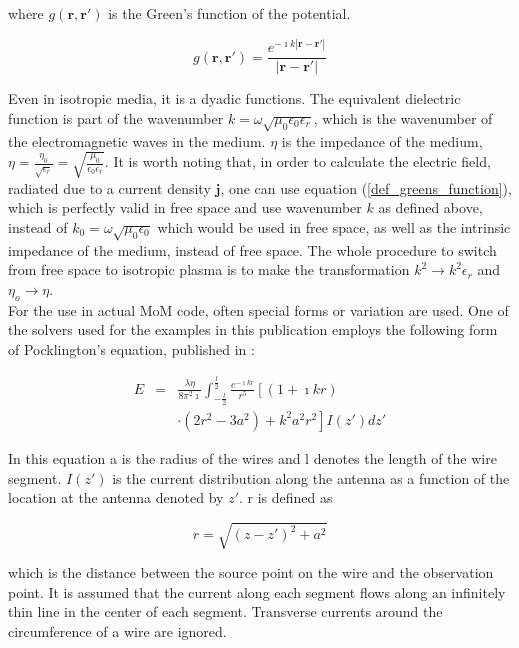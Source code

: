 \documentclass[two-column,ras]{agutex}
\begin{document}
\begin{article}
where $g(\mathbf{r},\mathbf{r'})$ is the Green's function of the potential.

\begin{equation}\label{eq:greens_func_vac}
    g(\mathbf{r},\mathbf{r'})= \frac{e^{- \imath k  | \mathbf{r}-\mathbf{r'} |}}{| \mathbf{r}-\mathbf{r'} |}
\end{equation}

Even in isotropic media, it is a dyadic functions. The equivalent dielectric function is part of the wavenumber $k=\omega \sqrt{\mu_0 \epsilon_0 \epsilon_r}$, which is the wavenumber of the electromagnetic waves in the medium. $\eta$ is the impedance of the medium, $\eta=\frac{\eta_0}{\sqrt{\epsilon_r}}=\sqrt{\frac{\mu_0}{\epsilon_0\epsilon_r}}$. It is worth noting that, in order to calculate the electric field, radiated due to a current density $\mathbf{j}$, one can use equation (\ref{def_greens_function}), which is perfectly valid in free space and use wavenumber $k$ as defined above, instead of $k_0=\omega \sqrt{\mu_0 \epsilon_0}$ which would be used in free space, as well as the intrinsic impedance of the medium, instead of free space. The whole procedure to switch from free space to isotropic plasma is to make the transformation $k^2 \rightarrow k^2\epsilon_r$ and $\eta_o \rightarrow \eta$.\\

For the use in actual MoM code, often special forms or variation are used. One of the solvers used for the examples in this publication employs the following form of Pocklington's equation, published in \cite{richmond66}:

\begin{eqnarray}
E&=&\frac{\lambda \eta}{8 \pi^2 \imath} \int_{-\frac{l}{2}}^{\frac{l}{2}} \frac{e^{-\imath k r}}{r^5} \left[ (1+\imath k r)\right.  \\
&&\left.  \cdot (2 r^2-3a^2)+k^2a^2r^2\right]I(z') dz'\nonumber
\end{eqnarray}

In this equation a is the radius of the wires and l denotes the length of the wire segment. $I(z')$ is the current distribution along the antenna as a function of the location at the antenna denoted by $z'$. r is defined as

\begin{equation}
 r=\sqrt{(z-z')^2+a^2}
\end{equation}

which is the distance between the source point on the wire and the observation point. It is assumed that the current along each segment flows along an infinitely thin line in the center of each segment. Transverse currents around the circumference of a wire are ignored.\\


\end{article}
\end{document}
